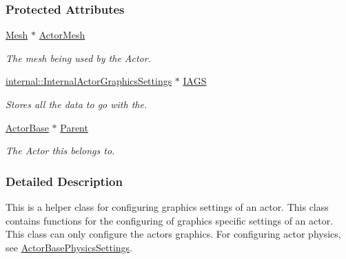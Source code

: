 \subsubsection*{Protected Attributes}
\begin{DoxyCompactItemize}
\item 
\hypertarget{classMezzanine_1_1ActorGraphicsSettings_af08131b13a21d6ab093435d8667e7c43}{
\hyperlink{classMezzanine_1_1Mesh}{Mesh} $\ast$ \hyperlink{classMezzanine_1_1ActorGraphicsSettings_af08131b13a21d6ab093435d8667e7c43}{ActorMesh}}
\label{classMezzanine_1_1ActorGraphicsSettings_af08131b13a21d6ab093435d8667e7c43}

\begin{DoxyCompactList}\small\item\em The mesh being used by the Actor. \item\end{DoxyCompactList}\item 
\hypertarget{classMezzanine_1_1ActorGraphicsSettings_a34adc6461ff0ac86785c497295ce2bb8}{
\hyperlink{classMezzanine_1_1internal_1_1InternalActorGraphicsSettings}{internal::InternalActorGraphicsSettings} $\ast$ \hyperlink{classMezzanine_1_1ActorGraphicsSettings_a34adc6461ff0ac86785c497295ce2bb8}{IAGS}}
\label{classMezzanine_1_1ActorGraphicsSettings_a34adc6461ff0ac86785c497295ce2bb8}

\begin{DoxyCompactList}\small\item\em Stores all the data to go with the. \item\end{DoxyCompactList}\item 
\hypertarget{classMezzanine_1_1ActorGraphicsSettings_a732df0cdf92958879669d122c782f267}{
\hyperlink{classMezzanine_1_1ActorBase}{ActorBase} $\ast$ \hyperlink{classMezzanine_1_1ActorGraphicsSettings_a732df0cdf92958879669d122c782f267}{Parent}}
\label{classMezzanine_1_1ActorGraphicsSettings_a732df0cdf92958879669d122c782f267}

\begin{DoxyCompactList}\small\item\em The Actor this belongs to. \item\end{DoxyCompactList}\end{DoxyCompactItemize}


\subsubsection{Detailed Description}
This is a helper class for configuring graphics settings of an actor. This class contains functions for the configuring of graphics specific settings of an actor. This class can only configure the actors graphics. For configuring actor physics, see \hyperlink{classMezzanine_1_1ActorBasePhysicsSettings}{ActorBasePhysicsSettings}. 

